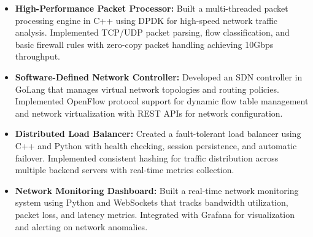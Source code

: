 

\begin{cventries}



 \begin{itemize}
 \item \textbf{High-Performance Packet Processor: } Built a multi-threaded packet processing engine in C++ using DPDK for high-speed network traffic analysis. Implemented TCP/UDP packet parsing, flow classification, and basic firewall rules with zero-copy packet handling achieving 10Gbps throughput.
 \item \textbf{Software-Defined Network Controller: } Developed an SDN controller in GoLang that manages virtual network topologies and routing policies. Implemented OpenFlow protocol support for dynamic flow table management and network virtualization with REST APIs for network configuration.
 \item \textbf{Distributed Load Balancer: } Created a fault-tolerant load balancer using C++ and Python with health checking, session persistence, and automatic failover. Implemented consistent hashing for traffic distribution across multiple backend servers with real-time metrics collection.
 \item \textbf{Network Monitoring Dashboard: } Built a real-time network monitoring system using Python and WebSockets that tracks bandwidth utilization, packet loss, and latency metrics. Integrated with Grafana for visualization and alerting on network anomalies.
  
 \end{itemize}


\end{cventries}
